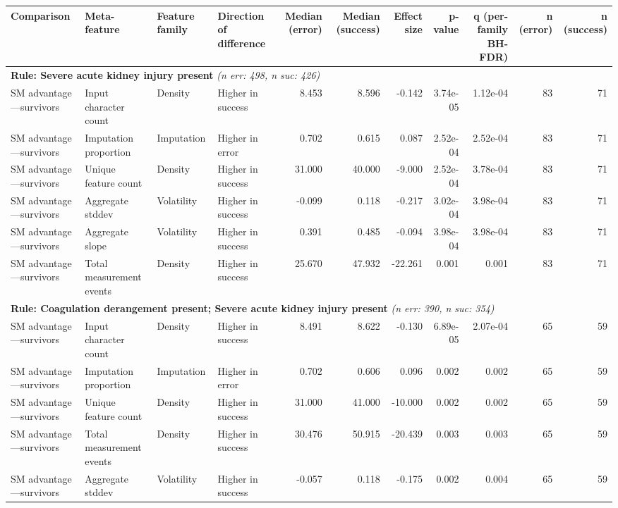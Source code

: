 \documentclass[border=0pt]{standalone}
\begin{document}
\begin{adjustbox}{width=\textwidth}
\begin{tabular}{@{}llllrrrrrrr@{}}
\toprule
Comparison & Meta-feature & Feature family & Direction of difference & Median (error) & Median (success) & Effect size & p-value & q (per-family BH-FDR) & n (error) & n (success) \\
\midrule
\multicolumn{11}{l}{\textbf{Rule: Severe acute kidney injury present} \textit{(n err: 498, n suc: 426)}} \\
SM advantage—survivors & Input character count & Density & Higher in success & 8.453 & 8.596 & -0.142 & 3.74e-05 & 1.12e-04 & 83 & 71 \\
SM advantage—survivors & Imputation proportion & Imputation & Higher in error & 0.702 & 0.615 & 0.087 & 2.52e-04 & 2.52e-04 & 83 & 71 \\
SM advantage—survivors & Unique feature count & Density & Higher in success & 31.000 & 40.000 & -9.000 & 2.52e-04 & 3.78e-04 & 83 & 71 \\
SM advantage—survivors & Aggregate stddev & Volatility & Higher in success & -0.099 & 0.118 & -0.217 & 3.02e-04 & 3.98e-04 & 83 & 71 \\
SM advantage—survivors & Aggregate slope & Volatility & Higher in success & 0.391 & 0.485 & -0.094 & 3.98e-04 & 3.98e-04 & 83 & 71 \\
SM advantage—survivors & Total measurement events & Density & Higher in success & 25.670 & 47.932 & -22.261 & 0.001 & 0.001 & 83 & 71 \\
\multicolumn{11}{l}{\textbf{Rule: Coagulation derangement present; Severe acute kidney injury present} \textit{(n err: 390, n suc: 354)}} \\
SM advantage—survivors & Input character count & Density & Higher in success & 8.491 & 8.622 & -0.130 & 6.89e-05 & 2.07e-04 & 65 & 59 \\
SM advantage—survivors & Imputation proportion & Imputation & Higher in error & 0.702 & 0.606 & 0.096 & 0.002 & 0.002 & 65 & 59 \\
SM advantage—survivors & Unique feature count & Density & Higher in success & 31.000 & 41.000 & -10.000 & 0.002 & 0.002 & 65 & 59 \\
SM advantage—survivors & Total measurement events & Density & Higher in success & 30.476 & 50.915 & -20.439 & 0.003 & 0.003 & 65 & 59 \\
SM advantage—survivors & Aggregate stddev & Volatility & Higher in success & -0.057 & 0.118 & -0.175 & 0.002 & 0.004 & 65 & 59 \\

\end{tabular}
\end{adjustbox}
\end{document}
